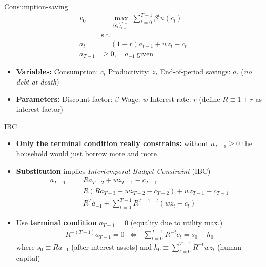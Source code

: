 \documentclass[
  10pt,
  ignorenonframetext,
  aspectratio=43,
  english,
]{beamer}
\providecommand{\tightlist}{%
  \setlength{\itemsep}{0pt}\setlength{\parskip}{0pt}}
\begin{document}
\begin{frame}{Consumption-saving}
\protect{}\label{consumption-saving}
\[
\begin{aligned}
v_{0} & =\max_{\{c_{t}\}^{T-1}_{t=0}}\sum^{T-1}_{t=0}\beta^{t}u(c_{t})\\
& \text{s.t.}\\
a_{t} & =(1+r)a_{t-1}+wz_{t}-c_{t}\\
a_{T-1} & \geq0, \quad a_{-1}\  \text{given}
\end{aligned}
\]

\begin{itemize}
\item
  \textbf{Variables:} Consumption: \(c_{t}\) Productivity: \(z_{t}\)
  End-of-period savings: \(a_{t}\) (\emph{no debt at death})
\item
  \textbf{Parameters:} Discount factor: \(\beta\) Wage: \(w\) Interest
  rate: \(r\) (define \(R\equiv1+r\) as interest factor)
\end{itemize}
\end{frame}

\begin{frame}{IBC}
\protect{}\label{ibc}
\begin{itemize}
\tightlist
\item
  \textbf{Only the terminal condition really constrains:} without
  \(a_{T-1}\geq0\) the household would just borrow more and more
\item
  \textbf{Substitution} implies \emph{Intertemporal Budget Constraint}
  (IBC) \[
    \begin{aligned}
    a_{T-1} & = & Ra_{T-2}+wz_{T-1}-c_{T-1}\\
    & = & R(Ra_{T-3}+wz_{T-2}-c_{T-2})+wz_{T-1}-c_{T-1}\\
    & = & R^{T}a_{-1}+\sum^{T-1}_{t=0}R^{T-1-t}(wz_{t}-c_{t})
    \end{aligned}
    \]
\item
  Use \textbf{terminal condition} \(a_{T-1}=0\) (equality due to utility
  max.) \[
    \begin{aligned}
    R^{-(T-1)}a_{T-1}=0 & \Leftrightarrow & \sum^{T-1}_{t=0}R^{-t}c_{t}=s_{0}+h_{0}
    \end{aligned}
    \] where \(s_{0}\equiv Ra_{-1}\) (after-interest assets) and
  \(h_{0}\equiv\sum^{T-1}_{t=0}R^{-t}wz_{t}\) (human capital)
\end{itemize}
\end{frame}
\end{document}
